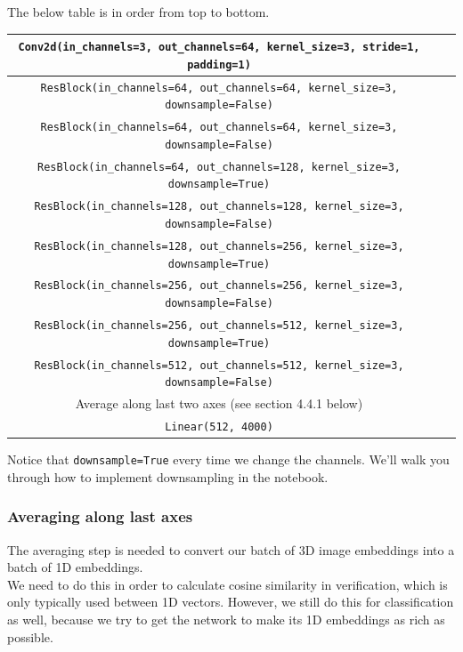 \documentclass{article}
\newcommand{\ttt}[1]{\texttt{#1}}
\begin{document}
The below table is in order from top to bottom.

\begin{center}
\begin{tabular}{ |c|c|c| } 
 \hline
\ttt{Conv2d(in\_channels=3, out\_channels=64, kernel\_size=3, stride=1, padding=1)}\\
 \hline
\ttt{ResBlock(in\_channels=64, out\_channels=64, kernel\_size=3, downsample=False)}\\
 \hline
\ttt{ResBlock(in\_channels=64, out\_channels=64, kernel\_size=3, downsample=False)}\\
 \hline
\ttt{ResBlock(in\_channels=64, out\_channels=128, kernel\_size=3, downsample=True)}\\
 \hline
\ttt{ResBlock(in\_channels=128, out\_channels=128, kernel\_size=3, downsample=False)}\\
 \hline
\ttt{ResBlock(in\_channels=128, out\_channels=256, kernel\_size=3, downsample=True)}\\
 \hline
\ttt{ResBlock(in\_channels=256, out\_channels=256, kernel\_size=3, downsample=False)}\\
 \hline
\ttt{ResBlock(in\_channels=256, out\_channels=512, kernel\_size=3, downsample=True)}\\
 \hline
\ttt{ResBlock(in\_channels=512, out\_channels=512, kernel\_size=3, downsample=False)}\\
 \hline
Average along last two axes (see section 4.4.1 below)\\
 \hline
\ttt{Linear(512, 4000)}\\
 \hline
\end{tabular}
\end{center}

Notice that \ttt{downsample=True} every time we change the channels. We'll walk you through how to implement downsampling in the notebook.

\subsubsection{Averaging along last axes}

The averaging step is needed to convert our batch of 3D image embeddings into a batch of 1D embeddings.  \\

We need to do this in order to calculate cosine similarity in verification, which is only typically used between 1D vectors. However, we still do this for classification as well, because we try to get the network to make its 1D embeddings as rich as possible.
\end{document}
